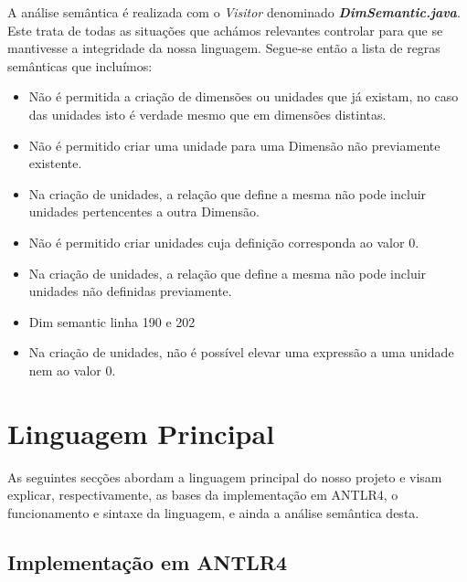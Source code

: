 \documentclass[10pt,portuguese]{article}
\begin{document}
\par A análise semântica é realizada com o \emph{Visitor} denominado \textbf{\emph{DimSemantic.java}}. Este trata de todas as situações que achámos relevantes controlar para que se mantivesse a integridade da nossa linguagem. Segue-se então a lista de regras semânticas que incluímos:
\begin{itemize}
    \item Não é permitida a criação de dimensões ou unidades que já existam, no caso das unidades isto é verdade mesmo que em dimensões distintas.
    \item Não é permitido criar uma unidade para uma Dimensão não previamente existente.
    \item Na criação de unidades, a relação que define a mesma não pode incluir unidades pertencentes a outra Dimensão.
    \item Não é permitido criar unidades cuja definição corresponda ao valor 0. 
    \item Na criação de unidades, a relação que define a mesma não pode incluir unidades não definidas previamente.
    \item Dim semantic linha 190 e 202
    \item Na criação de unidades, não é possível elevar uma expressão a uma unidade nem ao valor 0.
\end{itemize}

\newpage
\section{Linguagem Principal}

\par As seguintes secções abordam a linguagem principal do nosso projeto e visam explicar, respectivamente, as bases da implementação em ANTLR4, o funcionamento e sintaxe da linguagem, e ainda a análise semântica desta.

\subsection{Implementação em ANTLR4}
\end{document}
